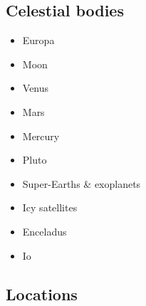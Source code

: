 \subsection*{Celestial bodies}

\begin{itemize}
\item Europa \cite{shha04,shha05,mish05,hash08}\cite{hash10}\cite{hash11,kast14,almc19}
\item Moon \cite{elvh02}\cite{elhg04}\cite{devv10} \cite{zhdv19} 
\item Venus \cite{scbg90,lekb91,kiha92,sqjs92,kief93,lekb93,lekb95,mopa95,somo96,mazk98}
\cite{resm98}\cite{moso98}
\cite{phha98}\cite{resm99}
\cite{vesh03}\cite{vavv05}\cite{stfh10}\cite{orso11,arta12}
\cite{huyz13}\cite{gita14}\cite{gery14b}\cite{cram17}\cite{dast17}\cite{king18}
\item Mars 
\cite{scbg90}
\cite{hach96}
\cite{resm98}
\cite{nist01}
\cite{lenm04}
\cite{vavv05}
\cite{losh06,rozh06,keso06}
\cite{rozh07}
\cite{loha08}
\cite{keta09,zhon09,rolm09,keso09}
\cite{srzh10}
\cite{gokg11}
\cite{srzh12}\cite{roar12}
\cite{ruts13}
\cite{seki14}
\cite{zhon16,kili16}
\cite{cimt18}
\item Mercury \cite{reki07,king08,roba12} 
\item Pluto \cite{mcnw16}
\item Super-Earths \& exoplanets \cite{stfl11}\cite{vata11}\cite{stlh13}\cite{welo15}
\item Icy satellites \cite{kasc12b}
\item Enceladus \cite{roni08,hats12,robg14}
\item Io \cite{tasg01}
\end{itemize}

\subsection*{Locations}

